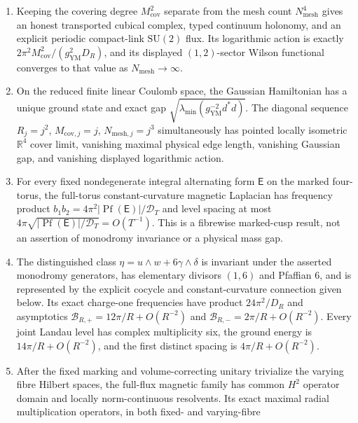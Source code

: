 \documentclass[11pt]{article}
\numberwithin{equation}{section}
\theoremstyle{definition}
\theoremstyle{remark}
\newcommand{\R}{\mathbb R}
\begin{document}
\begin{enumerate}[leftmargin=2.3em]
Coulomb reduction and removal of harmonic one-forms, has exact gap
\eqref{eq:continuum-YM-gap-exact} and closes as
$4\pi^2/(g_{\mathrm{YM}}^2T^2)$.  The exact finite cubical cochain Hessian
closes uniformly as $T^{-2}$ for every $N\ge2$; resolving the varying
continuum geometry is the separate condition $N/T\to\infty$.
\item Keeping the covering degree $M_{\mathrm{cov}}^2$ separate from the
mesh count $N_{\mathrm{mesh}}^4$ gives an honest transported cubical complex,
typed continuum holonomy, and an explicit periodic compact-link
$\mathrm{SU}(2)$ flux.  Its logarithmic action is exactly
$2\pi^2M_{\mathrm{cov}}^2/(g_{\mathrm{YM}}^2D_R)$, and its displayed
$(1,2)$-sector Wilson functional converges to that value as
$N_{\mathrm{mesh}}\to\infty$.
\item On the reduced finite linear Coulomb space, the Gaussian Hamiltonian
has a unique ground state and exact gap
$\sqrt{\lambda_{\min}(g_{\mathrm{YM}}^{-2}d^*d)}$.  The diagonal sequence
$R_j=j^2$, $M_{\mathrm{cov},j}=j$,
$N_{\mathrm{mesh},j}=j^3$ simultaneously has pointed locally isometric
$\R^4$ cover limit, vanishing maximal physical edge length, vanishing
Gaussian gap, and vanishing displayed logarithmic action.
\item For every fixed nondegenerate integral alternating form $\mathsf E$ on
the marked four-torus, the full-torus constant-curvature magnetic Laplacian
has frequency product
$b_1b_2=4\pi^2|\operatorname{Pf}(\mathsf E)|/\mathcal D_T$ and level spacing
at most
$4\pi\sqrt{|\operatorname{Pf}(\mathsf E)|/\mathcal D_T}=O(T^{-1})$.
This is a fibrewise marked-cusp result, not an assertion of monodromy
invariance or a physical mass gap.
\item The distinguished class
$\eta=u\wedge w+6\gamma\wedge\delta$ is invariant under the asserted
monodromy generators, has elementary divisors $(1,6)$ and Pfaffian $6$, and
is represented by the explicit cocycle and constant-curvature connection
given below.  Its exact charge-one frequencies have product
$24\pi^2/D_R$ and asymptotics
$\mathcal B_{R,+}=12\pi/R+O(R^{-2})$ and
$\mathcal B_{R,-}=2\pi/R+O(R^{-2})$.  Every joint Landau level has complex
multiplicity six, the ground energy is $14\pi/R+O(R^{-2})$, and the first
distinct spacing is $4\pi/R+O(R^{-2})$.
\item After the fixed marking and volume-correcting unitary trivialize the
varying fibre Hilbert spaces, the full-flux magnetic family has common
$H^2$ operator domain and locally norm-continuous resolvents.  Its exact
maximal radial multiplication operators, in both fixed- and varying-fibre

\end{enumerate}
\end{document}
